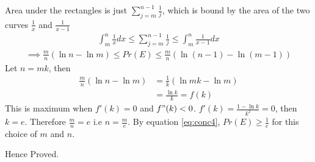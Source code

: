 \begin{tcolorbox}[breakable]
\begin{sol}
		Area under the rectangles is just $\sum_{j=m}^{n-1}\frac{1}{j}$, which is bound by the area of the two curves $\frac{1}{x}$ and $\frac{1}{x-1}$
		\begin{align}
			\int_{m}^{n} \frac{1}{x} dx \leq \sum_{j=m}^{n-1}\frac{1}{j} \leq \int_{m}^{n} \frac{1}{x-1} dx
		\end{align}
		\begin{align}
			\implies \frac{m}{n}(\ln{n} - \ln{m}) \leq Pr(E) \leq \frac{m}{n}(\ln{(n-1)} - \ln{(m-1)})
			\label{eq:conc4}
		\end{align}
		Let $n=mk$, then
		\begin{align}
			\frac{m}{n}(\ln{n} - \ln{m}) & = \frac{1}{k}(\ln{mk} - \ln{m}) \\
			                             & = \frac{\ln{k}}{k} = f(k)
		\end{align}
		This is maximum when $f'(k) = 0$ and $f"(k) < 0$. $f'(k) = \frac{1-\ln{k}}{k^2} = 0$, then $k=e$. Therefore $\frac{m}{n} = e$ i.e $n=\frac{m}{e}$.
		By equation \ref{eq:conc4}, $Pr(E) \geq \frac{1}{e}$ for this choice of $m$ and $n$.

		Hence Proved.
	\end{sol}
\end{tcolorbox}


